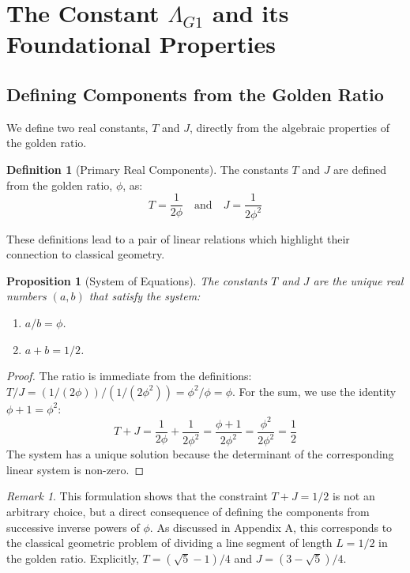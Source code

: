 \documentclass{amsart}
\theoremstyle{plain}
\newtheorem{proposition}[theorem]{Proposition}
\theoremstyle{definition}
\newtheorem{definition}[theorem]{Definition}
\theoremstyle{remark}
\newtheorem*{remark}{Remark}
\begin{document}
\section{The Constant \texorpdfstring{$\Lambda_{G1}$}{Lambda\_G1} and its Foundational Properties}

\subsection{Defining Components from the Golden Ratio}
We define two real constants, $T$ and $J$, directly from the algebraic properties of the golden ratio.

\begin{definition}[Primary Real Components]
The constants $T$ and $J$ are defined from the golden ratio, $\phi$, as:
$$ T = \frac{1}{2\phi} \quad \text{and} \quad J = \frac{1}{2\phi^2} $$
\end{definition}

These definitions lead to a pair of linear relations which highlight their connection to classical geometry.

\begin{proposition}[System of Equations]
The constants $T$ and $J$ are the unique real numbers $(a,b)$ that satisfy the system:
\begin{enumerate}
    \item $a/b = \phi$.
    \item $a+b = 1/2$.
\end{enumerate}
\end{proposition}
\begin{proof}
The ratio is immediate from the definitions: $T/J = (1/(2\phi))/(1/(2\phi^2)) = \phi^2/\phi = \phi$. For the sum, we use the identity $\phi+1 = \phi^2$:
$$ T+J = \frac{1}{2\phi} + \frac{1}{2\phi^2} = \frac{\phi+1}{2\phi^2} = \frac{\phi^2}{2\phi^2} = \frac{1}{2} $$
The system has a unique solution because the determinant of the corresponding linear system is non-zero.
\end{proof}

\begin{remark}
This formulation shows that the constraint $T+J=1/2$ is not an arbitrary choice, but a direct consequence of defining the components from successive inverse powers of $\phi$. As discussed in Appendix A, this corresponds to the classical geometric problem of dividing a line segment of length $L=1/2$ in the golden ratio. Explicitly, $T = (\sqrt{5}-1)/4$ and $J = (3-\sqrt{5})/4$.
\end{remark}
\end{document}
